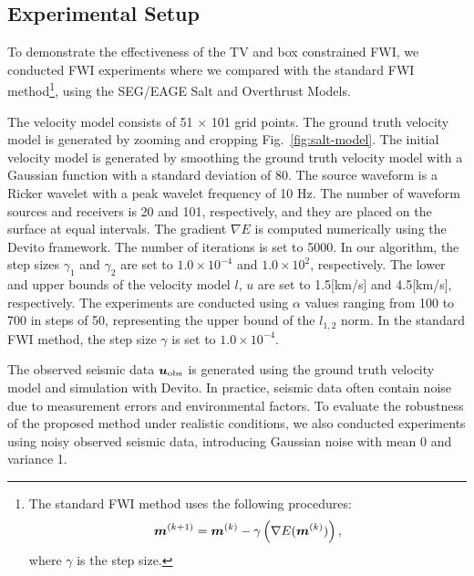 

\subsection{Experimental Setup} \label{subsec:experimental-setup}

To demonstrate the effectiveness of the TV and box constrained FWI, we conducted FWI experiments where we compared with the standard FWI method\footnote{
    \parbox{\linewidth}{The standard FWI method uses the following procedures:
        \begin{equation} \label{eq:FWIWithGradient} \FWIWithGradient, \end{equation}
        where $\gamma$ is the step size.}
}\cite{FWI0}, using the SEG/EAGE Salt and Overthrust Models.

The velocity model consists of 51 $\times$ 101 grid points.
The ground truth velocity model is generated by zooming and cropping Fig.~\ref{fig:salt-model}.
The initial velocity model is generated by smoothing the ground truth velocity model with a Gaussian function with a standard deviation of 80.
The source waveform is a Ricker wavelet with a peak wavelet frequency of 10 Hz.
The number of waveform sources and receivers is 20 and 101, respectively, and they are placed on the surface at equal intervals.
The gradient $\nabla E$ is computed numerically using the Devito framework\cite{devito}.
The number of iterations is set to 5000.
In our algorithm, the step sizes $\gamma_1$ and $\gamma_2$ are set to $1.0 \times 10^{-4}$ and $1.0 \times 10^2$, respectively.
The lower and upper bounds of the velocity model $l$, $u$ are set to 1.5[km/s] and 4.5[km/s], respectively.
The experiments are conducted using $\alpha$ values ranging from 100 to 700 in steps of 50, representing the upper bound of the $l_{1,2}$ norm.
In the standard FWI method, the step size $\gamma$ is set to $1.0 \times 10^{-4}$.

The observed seismic data $\bm{u}_{\mathrm{obs}}$ is generated using the ground truth velocity model and simulation with Devito.
In practice, seismic data often contain noise due to measurement errors and environmental factors.
To evaluate the robustness of the proposed method under realistic conditions, we also conducted experiments using noisy observed seismic data, introducing Gaussian noise with mean 0 and variance 1.





